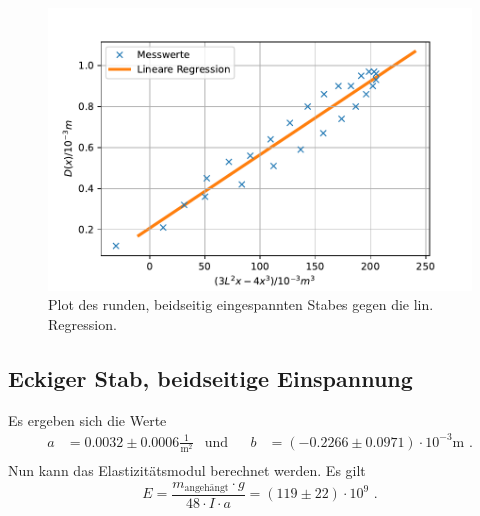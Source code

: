 \begin{figure}[H]
  \centering
  \includegraphics{pictures/Lineare Regression3.pdf}
  \caption{Plot des runden, beidseitig eingespannten Stabes gegen die lin. Regression.}
  \label{fig:plot3}
\end{figure}


\subsection{Eckiger Stab, beidseitige Einspannung}

Es ergeben sich die Werte 
\begin{align*}
  a &= 0.0032 ± 0.0006 \frac{1}{\unit{\meter\squared}} & \text{und}& & b&= (-0.2266 ± 0.0971) \cdot 10^{-3} \unit\meter \text{ .} \\
\end{align*}
Nun kann das Elastizitätsmodul berechnet werden. Es gilt
\begin{equation*}
  E = \frac{m_\text{angehängt} \cdot g}{48 \cdot I \cdot a} = (119 \pm 22) \cdot 10^{9} \text{ .}
\end{equation*}




